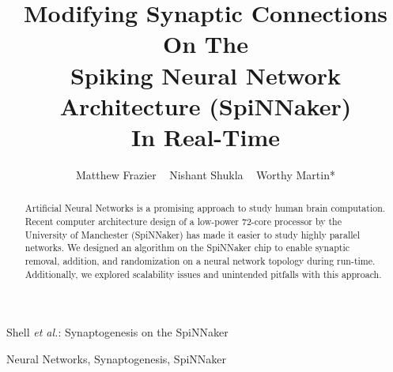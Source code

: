 \documentclass[journal]{./sty/IEEEtran}
\begin{document}
%
\title{Modifying Synaptic Connections On The\\Spiking Neural Network Architecture (SpiNNaker)\\In Real-Time
}


\author{Matthew Frazier ~
        Nishant Shukla ~
        Worthy Martin* }

%
{Shell \MakeLowercase{\textit{et al.}}: Synaptogenesis on the SpiNNaker}


\maketitle

\begin{abstract}
Artificial Neural Networks is a promising approach to study human brain computation. Recent computer architecture design of a low-power 72-core processor by the University of Manchester (SpiNNaker) has made it easier to study highly parallel networks. We designed an algorithm on the SpiNNaker chip to enable synaptic removal, addition, and randomization on a neural network topology during run-time. Additionally, we explored scalability issues and unintended pitfalls with this approach.

\end{abstract}

\begin{IEEEkeywords}
Neural Networks, Synaptogenesis, SpiNNaker
\end{IEEEkeywords}
\end{document}
